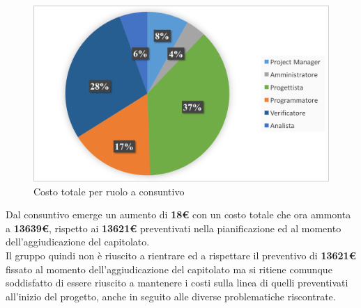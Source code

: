 \begin{figure}[H]
	\centering 
	\includegraphics[scale=0.7]{Immagini/GraficiCONS/DIFFCONS.png}
	\caption{Costo totale per ruolo a consuntivo}
\end{figure}

Dal consuntivo emerge un aumento di \textbf{18\euro} con un costo totale che ora ammonta a \textbf{13639\euro}, rispetto ai \textbf{13621\euro} preventivati nella pianificazione ed al momento dell'aggiudicazione del capitolato.\\
Il gruppo quindi non è riuscito a rientrare ed a rispettare il preventivo di \textbf{13621\euro} fissato al momento dell'aggiudicazione del capitolato ma si ritiene comunque soddisfatto di essere riuscito a mantenere i costi sulla linea di quelli preventivati all'inizio del progetto, anche in seguito alle diverse problematiche riscontrate.